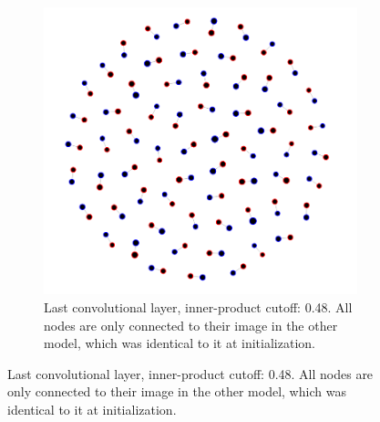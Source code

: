 \begin{figure}[H]
\centering
\begin{subfigure}[b]{0.62\textwidth}
   \includegraphics[width=\linewidth]{images/conv2-sgd-resampled.png}
   \caption{Last convolutional layer, inner-product cutoff: 0.48. All nodes are only connected to their image in the other model, which was identical to it at initialization.}
   \label{fig:conv2-sgd-resampled} 
\end{subfigure}


\end{figure}
